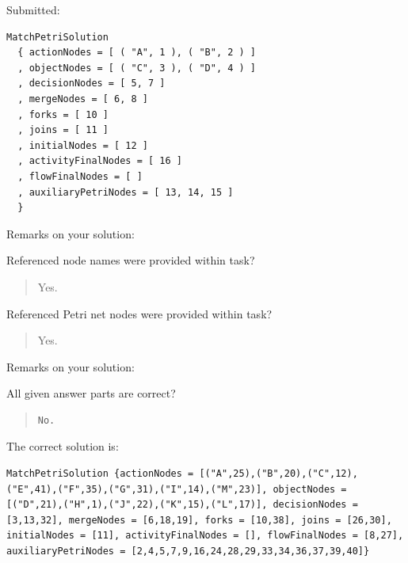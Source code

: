 Submitted:


\begin{verbatim}
MatchPetriSolution 
  { actionNodes = [ ( "A", 1 ), ( "B", 2 ) ]
  , objectNodes = [ ( "C", 3 ), ( "D", 4 ) ]
  , decisionNodes = [ 5, 7 ]
  , mergeNodes = [ 6, 8 ]
  , forks = [ 10 ]
  , joins = [ 11 ]
  , initialNodes = [ 12 ]
  , activityFinalNodes = [ 16 ]
  , flowFinalNodes = [ ]
  , auxiliaryPetriNodes = [ 13, 14, 15 ] 
  }
\end{verbatim}


Remarks on your solution:

Referenced node names were provided within task?\begin{quote}Yes.\end{quote}Referenced Petri net nodes were provided within task?\begin{quote}Yes.\end{quote}Remarks on your solution:

All given answer parts are correct?

\begin{quote}
\begin{verbatim}
No.
\end{verbatim}
\end{quote}

The correct solution is:
\begin{verbatim}
MatchPetriSolution {actionNodes = [("A",25),("B",20),("C",12),("E",41),("F",35),("G",31),("I",14),("M",23)], objectNodes = [("D",21),("H",1),("J",22),("K",15),("L",17)], decisionNodes = [3,13,32], mergeNodes = [6,18,19], forks = [10,38], joins = [26,30], initialNodes = [11], activityFinalNodes = [], flowFinalNodes = [8,27], auxiliaryPetriNodes = [2,4,5,7,9,16,24,28,29,33,34,36,37,39,40]}
\end{verbatim}


